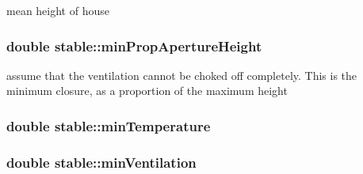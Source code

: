 mean height of house \hypertarget{classstable_a8c04cadb037dac13736a1a862977d7e5}{
\subsubsection[{minPropApertureHeight}]{\setlength{\rightskip}{0pt plus 5cm}double {\bf stable::minPropApertureHeight}}}
\label{classstable_a8c04cadb037dac13736a1a862977d7e5}


assume that the ventilation cannot be choked off completely. This is the minimum closure, as a proportion of the maximum height \hypertarget{classstable_ae3d42ac372bdf768d47ade3cf5ec3691}{
\subsubsection[{minTemperature}]{\setlength{\rightskip}{0pt plus 5cm}double {\bf stable::minTemperature}}}
\label{classstable_ae3d42ac372bdf768d47ade3cf5ec3691}
\hypertarget{classstable_ac9723b32bae1707d7b962f446d10627a}{
\subsubsection[{minVentilation}]{\setlength{\rightskip}{0pt plus 5cm}double {\bf stable::minVentilation}}}
\label{classstable_ac9723b32bae1707d7b962f446d10627a}


